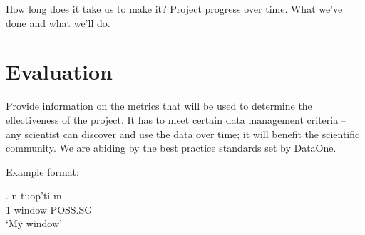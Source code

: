 \documentclass[12 pt]{article}
\begin{document}
How long does it take us to make it? Project progress over time. What we've done and what we'll do.



\section {Evaluation}

Provide information on the metrics that will be used to determine the effectiveness of the project. It has to meet certain data management criteria -- any scientist can discover and use the data over time; it will benefit the scientific community. We are abiding by the best practice standards set by DataOne.   

Example format: 

\exg. n-tuop'ti-m\\
1-window-POSS.SG\\
`My window'
\end{document}
